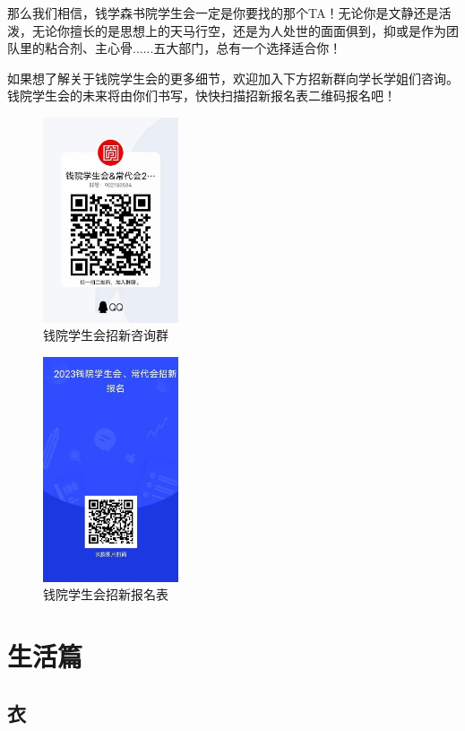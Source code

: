 \documentclass[
decoration,  %
]{qyxf-book}
\begin{document}
    那么我们相信，钱学森书院学生会一定是你要找的那个TA！无论你是文静还是活泼，无论你擅长的是思想上的天马行空，还是为人处世的面面俱到，抑或是作为团队里的粘合剂、主心骨......五大部门，总有一个选择适合你！

    如果想了解关于钱院学生会的更多细节，欢迎加入下方招新群向学长学姐们咨询。钱院学生会的未来将由你们书写，快快扫描招新报名表二维码报名吧！

	\begin{figure}[htbp]
	\centering
	\includegraphics[width=4cm]{pics/zhaoxin1.png}
	\setlength{\abovecaptionskip}{0.0cm}
	\setlength{\belowcaptionskip}{0.2cm}
	\caption*{钱院学生会招新咨询群}
	\end{figure}
	\begin{figure}[htbp]
	\centering
	\includegraphics[width=4cm]{pics/zhaoxin2.png}
	\setlength{\abovecaptionskip}{0.0cm}
	\setlength{\belowcaptionskip}{0.2cm}
	\caption*{钱院学生会招新报名表}
	\end{figure}
	
	\newpage
	
	\chapter{生活篇}\label{ux4e8cux751fux6d3bux7bc7}
	
	\hypertarget{ux4e00ux8863}{%
		\section{衣}\label{ux4e00ux8863}}
	
\end{document}
